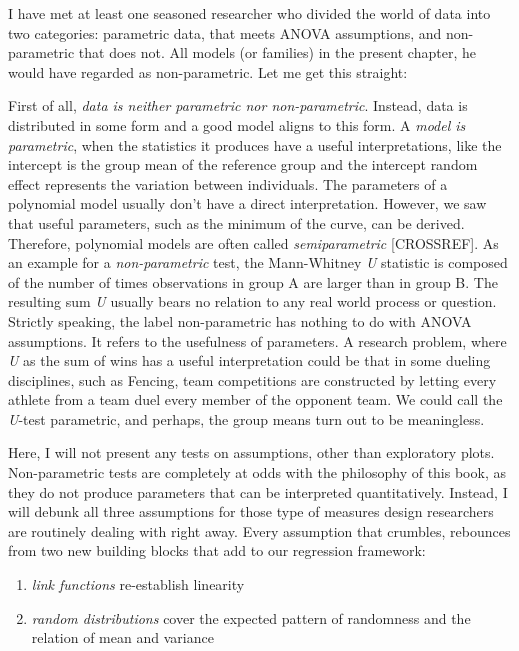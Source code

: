\documentclass[]{svmono}
\providecommand{\tightlist}{%
  \setlength{\itemsep}{0pt}\setlength{\parskip}{0pt}}
\begin{document}
I have met at least one seasoned researcher who divided the world of
data into two categories: parametric data, that meets ANOVA assumptions,
and non-parametric that does not. All models (or families) in the
present chapter, he would have regarded as non-parametric. Let me get
this straight:

First of all, \emph{data is neither parametric nor non-parametric}.
Instead, data is distributed in some form and a good model aligns to
this form. A \emph{model is parametric}, when the statistics it produces
have a useful interpretations, like the intercept is the group mean of
the reference group and the intercept random effect represents the
variation between individuals. The parameters of a polynomial model
usually don't have a direct interpretation. However, we saw that useful
parameters, such as the minimum of the curve, can be derived. Therefore,
polynomial models are often called \emph{semiparametric} {[}CROSSREF{]}.
As an example for a \emph{non-parametric} test, the Mann-Whitney
\emph{U} statistic is composed of the number of times observations in
group A are larger than in group B. The resulting sum \emph{U} usually
bears no relation to any real world process or question. Strictly
speaking, the label non-parametric has nothing to do with ANOVA
assumptions. It refers to the usefulness of parameters. A research
problem, where \emph{U} as the sum of wins has a useful interpretation
could be that in some dueling disciplines, such as Fencing, team
competitions are constructed by letting every athlete from a team duel
every member of the opponent team. We could call the \emph{U}-test
parametric, and perhaps, the group means turn out to be meaningless.

Here, I will not present any tests on assumptions, other than
exploratory plots. Non-parametric tests are completely at odds with the
philosophy of this book, as they do not produce parameters that can be
interpreted quantitatively. Instead, I will debunk all three assumptions
for those type of measures design researchers are routinely dealing with
right away. Every assumption that crumbles, rebounces from two new
building blocks that add to our regression framework:

\begin{enumerate}
\def\labelenumi{\arabic{enumi}.}
\tightlist
\item
  \emph{link functions} re-establish linearity
\item
  \emph{random distributions} cover the expected pattern of randomness
  and the relation of mean and variance
\end{enumerate}
\end{document}
